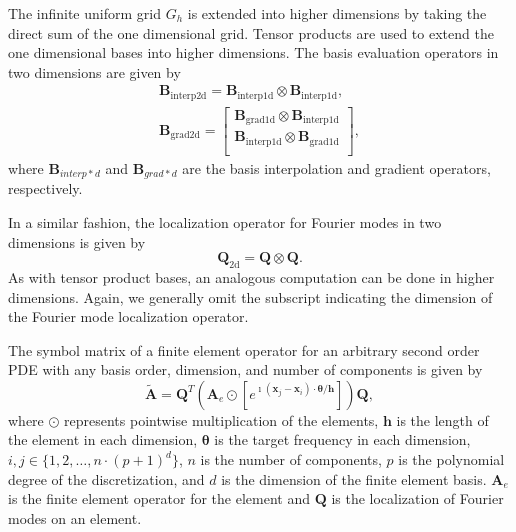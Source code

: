 \documentclass[review]{siamart190516}
\begin{document}
The infinite uniform grid $G_h$ is extended into higher dimensions by taking the direct sum of the one dimensional grid.
Tensor products are used to extend the one dimensional bases into higher dimensions.
The basis evaluation operators in two dimensions are given by
\begin{equation}
\begin{split}
\mathbf{B}_{\text{interp2d}} = \mathbf{B}_{\text{interp1d}} \otimes \mathbf{B}_{\text{interp1d}}, \\
\mathbf{B}_{\text{grad2d}} =
\begin{bmatrix}
    \mathbf{B}_{\text{grad1d}} \otimes \mathbf{B}_{\text{interp1d}} \\
    \mathbf{B}_{\text{interp1d}} \otimes \mathbf{B}_{\text{grad1d}} \\
\end{bmatrix},
\end{split}
\end{equation}
where $\mathbf{B}_{interp*d}$ and $\mathbf{B}_{grad*d}$ are the basis interpolation and gradient operators, respectively.

In a similar fashion, the localization operator for Fourier modes in two dimensions is given by
\begin{equation}
\mathbf{Q}_{\text{2d}} = \mathbf{Q} \otimes \mathbf{Q}.
\end{equation}
As with tensor product bases, an analogous computation can be done in higher dimensions.
Again, we generally omit the subscript indicating the dimension of the Fourier mode localization operator.

\begin{definition}\label{def:high_order_symbol}
The symbol matrix of a finite element operator for an arbitrary second order PDE with any basis order, dimension, and number of components is given by
\begin{equation}\label{symbolhighorder}
\tilde{\mathbf{A}} = \mathbf{Q}^T \left( \mathbf{A}_e \odot \left[ e^{\imath \left( \mathbf{x}_j - \mathbf{x}_i \right) \cdot \boldsymbol{\theta} / \mathbf{h}} \right] \right) \mathbf{Q},
\end{equation}
where $\odot$ represents pointwise multiplication of the elements, $\mathbf{h}$ is the length of the element in each dimension, $\boldsymbol{\theta}$ is the target frequency in each dimension, $i, j \in \lbrace 1, 2, \dots, n \cdot \left( p + 1 \right)^d \rbrace$, $n$ is the number of components, $p$ is the polynomial degree of the discretization, and $d$ is the dimension of the finite element basis.
$\mathbf{A}_e$ is the finite element operator for the element and $\mathbf{Q}$ is the localization of Fourier modes on an element.
\end{definition}
\end{document}
